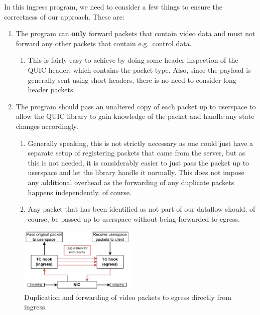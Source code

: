 In this ingress program, we need to consider a few things to ensure the correctness
of our approach.
These are:
\begin{enumerate}
    \item   The program can \textbf{only} forward packets that contain video data and must not 
            forward any other packets that contain e.g.~control data.
    \begin{enumerate}
        \item   This is fairly easy to achieve by doing some header inspection of the QUIC header,
                which contains the packet type. Also, since the payload is generally sent using 
                short-headers, there is no need to consider long-header packets.
    \end{enumerate}

    \item   The program should pass an unaltered copy of each packet up to userspace to allow the 
            QUIC library to gain knowledge of the packet and handle any state changes accordingly.
    \begin{enumerate}
        \item   Generally speaking, this is not strictly necessary as one could just have a separate 
                setup of registering packets that came from the server, but as this is not needed,
                it is considerably easier to just pass the packet up to userspace and let the 
                library handle it normally. This does not impose any additional overhead as the
                forwarding of any duplicate packets happens independently, of course.
        \item   Any packet that has been identified as not part of our dataflow should, of course, 
                be passed up to userspace without being forwarded to egress.
    \end{enumerate}
\end{enumerate}

\begin{figure}[htbp]
    \centering
    \includegraphics[width=0.5\textwidth]{figures/03_fast_relays/packet-forwarding.drawio.pdf}
    \caption[Video packet duplication]{Duplication and forwarding of video packets to egress directly 
    from ingress.}\label{fig:packet-forwarding-duplication}
\end{figure}

